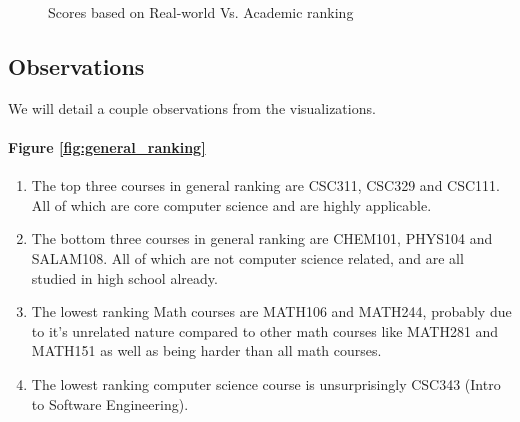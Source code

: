 \documentclass[12pt,a4paper]{article}
\begin{document}
\begin{figure}
    \centering
    \caption{Scores based on Real-world Vs. Academic ranking}
    \label{fig:my_label}
\end{figure}


\clearpage

\subsection{Observations}
We will detail a couple observations from the visualizations.

\paragraph{Figure \ref{fig:general_ranking}}
\begin{enumerate}
    \item The top three courses in general ranking are CSC311, CSC329 and CSC111. All of which are core computer science and are highly applicable.
    \item The bottom three courses in general ranking are CHEM101, PHYS104 and SALAM108. All of which are not computer science related, and are all studied in high school already.
    \item The lowest ranking Math courses are MATH106 and MATH244, probably due to it's unrelated nature compared to other math courses like MATH281 and MATH151 as well as being harder than all math courses.
    \item The lowest ranking computer science course is unsurprisingly CSC343 (Intro to Software Engineering).
\end{enumerate}
\end{document}
